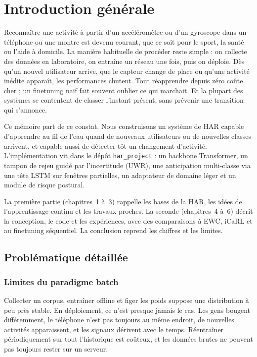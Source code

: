 \chapter*{Introduction générale}
\label{chap:introduction}

Reconnaître une activité à partir d'un accéléromètre ou d'un gyroscope dans un
téléphone ou une montre est devenu courant, que ce soit pour le sport, la santé
ou l'aide à domicile. La manière habituelle de procéder reste simple : on
collecte des données en laboratoire, on entraîne un réseau une fois, puis on
déploie. Dès qu'un nouvel utilisateur arrive, que le capteur change de place
ou qu'une activité inédite apparaît, les performances chutent. Tout réapprendre
depuis zéro coûte cher ; un finetuning naïf fait souvent oublier ce qui
marchait. Et la plupart des systèmes se contentent de classer l'instant
présent, sans prévenir une transition qui s'annonce.

Ce mémoire part de ce constat. Nous construisons un système de HAR capable
d'apprendre au fil de l'eau quand de nouveaux utilisateurs ou de nouvelles
classes arrivent, et capable aussi de détecter tôt un changement d'activité.
L'implémentation vit dans le dépôt \texttt{har\_project} : un backbone
Transformer, un tampon de rejeu guidé par l'incertitude (UWR), une
anticipation multi-classe via une tête LSTM sur fenêtres partielles, un
adaptateur de domaine léger et un module de risque postural.

La première partie (chapitres~1 à~3) rappelle les bases de la HAR, les idées
de l'apprentissage continu et les travaux proches. La seconde (chapitres~4
à~6) décrit la conception, le code et les expériences, avec des comparaisons
à EWC, iCaRL et au finetuning séquentiel. La conclusion reprend les chiffres
et les limites.

\section{Problématique détaillée}

\subsection{Limites du paradigme batch}

Collecter un corpus, entraîner offline et figer les poids suppose une
distribution à peu près stable. En déploiement, ce n'est presque jamais le
cas. Les gens bougent différemment, le téléphone n'est pas toujours au même
endroit, de nouvelles activités apparaissent, et les signaux dérivent avec le
temps. Réentraîner périodiquement sur tout l'historique est coûteux, et les
données brutes ne peuvent pas toujours rester sur un serveur.

